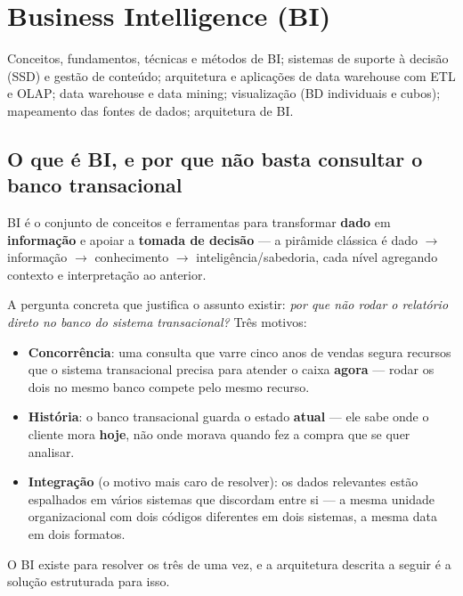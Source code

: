 \chapter{Business Intelligence (BI)}
\label{cap:bi-teoria}

\begin{edital}
Conceitos, fundamentos, técnicas e métodos de BI; sistemas de suporte à
decisão (SSD) e gestão de conteúdo; arquitetura e aplicações de data
warehouse com ETL e OLAP; data warehouse e data mining; visualização (BD
individuais e cubos); mapeamento das fontes de dados; arquitetura de BI.
\end{edital}

\section{O que é BI, e por que não basta consultar o banco transacional}

\begin{conceito}
BI é o conjunto de conceitos e ferramentas para transformar \textbf{dado}
em \textbf{informação} e apoiar a \textbf{tomada de decisão} --- a
pirâmide clássica é dado $\to$ informação $\to$ conhecimento $\to$
inteligência/sabedoria, cada nível agregando contexto e interpretação ao
anterior.

A pergunta concreta que justifica o assunto existir: \textit{por que não
rodar o relatório direto no banco do sistema transacional?} Três motivos:

\begin{itemize}
\item \textbf{Concorrência}: uma consulta que varre cinco anos de vendas
segura recursos que o sistema transacional precisa para atender o caixa
\textbf{agora} --- rodar os dois no mesmo banco compete pelo mesmo
recurso.
\item \textbf{História}: o banco transacional guarda o estado
\textbf{atual} --- ele sabe onde o cliente mora \textbf{hoje}, não onde
morava quando fez a compra que se quer analisar.
\item \textbf{Integração} (o motivo mais caro de resolver): os dados
relevantes estão espalhados em vários sistemas que discordam entre si --- a
mesma unidade organizacional com dois códigos diferentes em dois sistemas,
a mesma data em dois formatos.
\end{itemize}

O BI existe para resolver os três de uma vez, e a arquitetura descrita a
seguir é a solução estruturada para isso.
\end{conceito}


